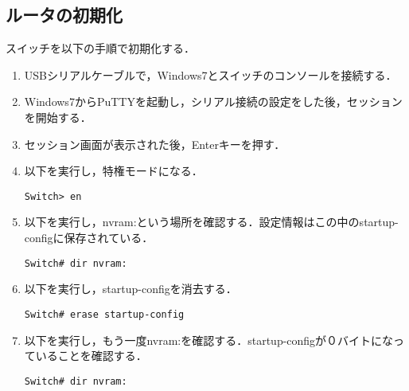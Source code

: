 \documentclass[a4j,titlepage]{jarticle}
\begin{document}
\begin{enumerate}
\begin{enumerate}
\end{enumerate}

\subsection{ルータの初期化}
スイッチを以下の手順で初期化する．

\begin{enumerate}

\item USBシリアルケーブルで，Windows7とスイッチのコンソールを接続する．

\item Windows7からPuTTYを起動し，シリアル接続の設定をした後，セッションを開始する．

\item セッション画面が表示された後，Enterキーを押す．

\item 以下を実行し，特権モードになる．
\begin{screen}
\begin{center}
\begin{verbatim}
Switch> en
\end{verbatim}
\end{center}
\end{screen}

\item 以下を実行し，nvram:という場所を確認する．設定情報はこの中のstartup-configに保存されている．
\begin{screen}
\begin{center}
\begin{verbatim}
Switch# dir nvram:
\end{verbatim}
\end{center}
\end{screen}

\item 以下を実行し，startup-configを消去する．
\begin{screen}
\begin{center}
\begin{verbatim}
Switch# erase startup-config
\end{verbatim}
\end{center}
\end{screen}

\item 以下を実行し，もう一度nvram:を確認する．startup-configが０バイトになっていることを確認する．
\begin{screen}
\begin{center}
\begin{verbatim}
Switch# dir nvram:
\end{verbatim}
\end{center}
\end{screen}


\end{enumerate}
\end{enumerate}
\end{document}
